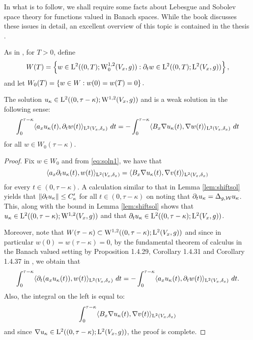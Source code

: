 \documentclass[a4paper, 12pt]{amsart}
\begin{document}
In what is to follow, we shall require some facts about 
Lebesgue and Sobolev space theory for functions valued 
in Banach spaces. While the book \cite{CH} discusses these issues
in detail, an excellent overview of this topic
is contained in the thesis \cite{Kreuter}.

As in \cite{CS}, for $T > 0$, define 
$$ W(T) = \set{ w \in \Lp{2}( (0,T); \SobH[0]{1}(V_x,g)): \partial_t w \in \Lp{2}((0,T); \Lp{2}(V_x, g))},$$
and let $W_0(T) = \set{ w \in W: w(0) = w(T) = 0}.$

\begin{lemma}
\label{Lem:testfn2} 
The solution $u_\kappa \in \Lp{2}((0, \tau - \kappa); \SobH{1}(V_x, g))$
and is a weak solution in the following sense:
\begin{equation}
\label{eq:testfn2} 
\int_{0}^{\tau - \kappa} \inprod{a_x u_\kappa(t), \partial_t w(t)}_{\Lp{2}(V_x,\delta_x)}\ dt 
		= -\int_{0}^{\tau - \kappa } \inprod{B_x \nabla u_\kappa(t), \nabla w(t)}_{\Lp{2}(V_x, \delta_x)}\ dt
\end{equation}
for all $w \in W_0(\tau - \kappa)$.
\end{lemma}
\begin{proof}
Fix $w \in W_0$ and from \eqref{eq:soln1}, we have that
$$\inprod{a_x \partial_t u_\kappa (t), w(t)}_{\Lp{2}(V_x, \delta_x)} 
		= \inprod{ B_x \nabla u_\kappa(t), \nabla v(t)}_{\Lp{2}(V_x, \delta_x)}$$
for every $t \in (0, \tau - \kappa)$.
A calculation similar to that in Lemma \ref{lem:shiftsol} 
yields that $\norm{ \partial_t u_\kappa} \leq C_\kappa'$
for all $t \in (0, \tau - \kappa)$
on noting that $\partial_t u_\kappa = \Delta_{g,\cW} u_\kappa$.
This, along with the bound in Lemma \ref{lem:shiftsol}
shows that  $u_\kappa \in \Lp{2}((0, \tau - \kappa); \SobH{1}(V_x, g))$
and that $\partial_t u_\kappa \in \Lp{2}((0,\tau - \kappa); \Lp{2}(V_x, g))$. 

Moreover, note that $W(\tau- \kappa) \subset \SobH{1}((0,\tau-\kappa); \Lp{2}(V_x,g))$
and since in particular $w(0) = w(\tau - \kappa) = 0$, by the fundamental theorem of calculus in the Banach 
valued setting by Proposition 1.4.29, Corollary 1.4.31 and Corollary 1.4.37 in  \cite{CH}, we obtain that
$$\int_{0}^{\tau - \kappa} \inprod{ \partial_t(a_x u_\kappa(t)), w(t)}_{\Lp{2}(V_x,\delta_x)}\ dt
	= - \int_0^{\tau - \kappa} \inprod{a_x u_\kappa(t), \partial_t w(t)}_{\Lp{2}(V_x, \delta_x)}\ dt.$$
Also, the integral on the left is equal to:
$$ \int_0^{\tau - \kappa}  \inprod{ B_x \nabla u_\kappa(t), \nabla v(t)}_{\Lp{2}(V_x, \delta_x)}$$
and since  $\nabla u_\kappa \in \Lp{2}((0, \tau - \kappa); \Lp{2}(V_x,g))$,
the proof is complete.
\end{proof} 
\end{document}
